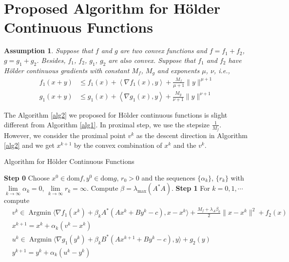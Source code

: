 \documentclass{article}
\numberwithin{equation}{section}
\newtheorem{assumption}{Assumption}[section]
\def\Argmin{\mathop{\mathrm{Argmin}}}
\begin{document}
\section{Proposed Algorithm for H\"older Continuous Functions}
\begin{assumption} \label{Assumption_holder}
    Suppose that $f$ and $g$ are two convex functions and $f = f_1 + f_2$, $g = g_1+ g_2$.
    Besides, $f_1$, $f_2$, $g_1$, $g_2$ are also convex. Suppose that $f_1$ and $f_2$ have H\"older continuous gradients with constant $M_f$, $M_g$
    and exponents $\mu$, $\nu$, i.e.,
    \begin{align}
        f_1(x+y) &\leq f_1(x) + \left\langle \nabla f_1(x), y \right\rangle +\frac{M_f}{\mu +1}
        \|y\rVert^{\mu +1} \nonumber \\
        g_1(x+y) & \leq g_1(x) + \left\langle \nabla g_1(x), y \right\rangle +\frac{M_g}{\nu+1}
        \|y\rVert^{\nu+1} \label{Holder_property}
    \end{align}
\end{assumption}

The Algorithm \ref{alg2} we proposed for H\"older continuous functions is slight different from Algorithm
\ref{alg1}. In proximal step, we use the stepsize $\frac{1}{M_f}$. However, we consider the proximal
point $v^k$ as the descent direction in Algorithm \ref{alg2} and we get $x^{k+1}$ by the convex combination of $x^k$ and the 
$v^k$.

\begin{algorithm}
	\caption{ Algorithm for H\"older Continuous Functions}
	\label{alg2}
	\begin{algorithmic}
		\STATE \textbf{Step 0} Choose $x^0 \in \mathrm{dom}f, y^0 \in \mathrm{dom}g$, $r_0 >0$ and the sequences $\{\alpha_k\}$,
        $\{r_k\}$ with $\lim\limits_{k\rightarrow \infty}\alpha_k = 0$, $\lim\limits_{k\rightarrow\infty}r_k=\infty$. Compute $\beta= \lambda_{\max}({A^*A})$.
		\STATE \textbf{Step 1} For $k=0,1,\cdots$ compute
            \begin{align}
                &v^k \in \Argmin \langle \nabla f_1(x^k) + \beta_{k}A^*(Ax^k+By^k-c), x-x^k\rangle +\frac{M_f+\lambda_{A} \beta_{k}}{2}\|x-x^k\rVert^2 +f_2(x) \nonumber \\
                &x^{k+1} = x^k+\alpha_k(v^k - x^k)  \\
                & u^k \in \Argmin \langle\nabla g_1(y^k) + \beta_{k}B^*(Ax^{k+1} +By^k-c),y\rangle +g_2(y) \nonumber \\
                & y^{k+1} = y^{k} +\alpha_k(u^k-y^k)  \label{get_y_k_holder}
            \end{align}
	\end{algorithmic}  
\end{algorithm}
\end{document}
